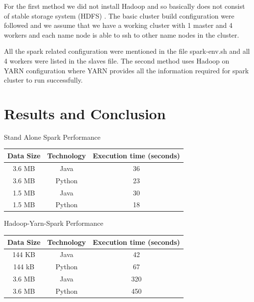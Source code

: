 For the first method we did not install Hadoop and so basically does not consist
 of stable storage system (HDFS) . The basic cluster build configuration were 
 followed and we assume that we have a working cluster with 1 master and 4 
 workers and each name node is able to ssh to other name nodes in the cluster. 

All the spark related configuration were mentioned in the file spark-env.sh and 
all 4 workers were listed in the slaves file.
The second method uses Hadoop on YARN configuration where YARN provides all the 
information required for spark cluster to run successfully.






\section{Results and Conclusion}


% 


\begin{center}
Stand Alone Spark Performance
\end{center}

\begin{center}
    \begin{tabular}{ | c | c | c |}
    \hline
    Data Size & Technology & Execution time (seconds) \\ \hline
    3.6 MB & Java & 36 \\ \hline
    3.6 MB & Python & 23\\ \hline
    1.5 MB & Java & 30 \\ \hline
    1.5 MB & Python & 18 \\
    \hline
    \end{tabular}
\end{center}

\begin{center}
Hadoop-Yarn-Spark Performance
\end{center}

\begin{center}
    \begin{tabular}{ | c | c | c |}
    \hline
    Data Size & Technology & Execution time (seconds) \\ \hline
    144 KB & Java & 42   \\ \hline
    144 kB & Python & 67 \\ \hline
    3.6 MB & Java &  320  \\ \hline
    3.6 MB & Python & 450 \\
    \hline
    \end{tabular} 
\end{center}


